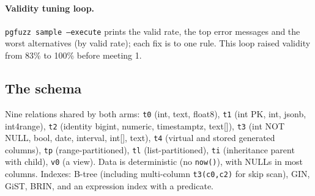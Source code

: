 \paragraph{Validity tuning loop.} \texttt{pgfuzz sample --execute} prints the
valid rate, the top error messages and the worst alternatives (by valid
rate); each fix is to one rule. This loop raised validity from 83\% to 100\%
before meeting 1.

\subsection{The schema}

Nine relations shared by both arms: \texttt{t0} (int, text, float8), \texttt{t1}
(int PK, int, jsonb, int4range), \texttt{t2} (identity bigint, numeric,
timestamptz, text[]), \texttt{t3} (int NOT NULL, bool, date, interval, int[],
text), \texttt{t4} (virtual and stored generated columns), \texttt{tp}
(range-partitioned), \texttt{tl} (list-partitioned), \texttt{ti} (inheritance
parent with child), \texttt{v0} (a view). Data is deterministic (no
\texttt{now()}), with NULLs in most columns. Indexes: B-tree (including
multi-column \texttt{t3(c0,c2)} for skip scan), GIN, GiST, BRIN, and an
expression index with a predicate.
